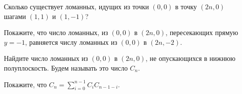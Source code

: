 \begin{enumcyr}
    \item Сколько существует ломанных, идущих из точки $(0, 0)$ в точку $(2n, 0)$ шагами $(1, 1)$ и $(1,
        -1)$?
    \item Покажите, что число ломанных, из $(0, 0)$ в $(2n, 0)$, пересекающих прямую $y = -1$, равняется
        числу ломанных из $(0, 0)$ в $(2n, -2)$.
    \item Найдите число ломанных из $(0, 0)$ в $(2n, 0)$, не опускающихся в нижнюю полуплоскость. Будем
        называть это число  $C_n$.
    \item Покажите, что $C_n = \sum\limits_{i = 0}^{n - 1} C_i C_{n - 1 - i}$.
\end{enumcyr}